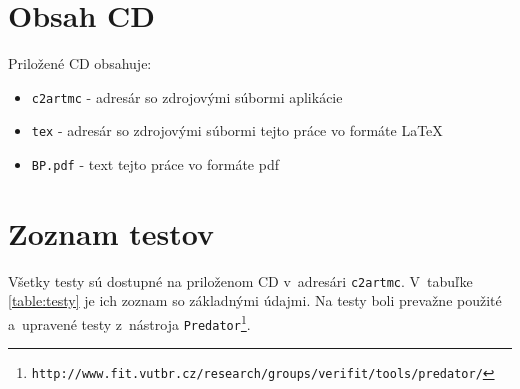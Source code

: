 





\chapter{Obsah CD}
Priložené CD obsahuje:
\begin{itemize}
\item \texttt{c2artmc} - adresár so zdrojovými súbormi aplikácie
\item \texttt{tex} - adresár so zdrojovými súbormi tejto práce vo formáte \LaTeX
\item \texttt{BP.pdf} - text tejto práce vo formáte pdf  
\end{itemize}

\chapter{Zoznam testov}
\label{priloha:testy}
Všetky testy sú dostupné na priloženom CD v~adresári \texttt{c2artmc}. V~tabuľke \ref{table:testy} je ich zoznam so základnými údajmi. Na testy boli prevažne použité a~upravené testy z~nástroja \texttt{Predator\footnote{http://www.fit.vutbr.cz/research/groups/verifit/tools/predator/}}.

